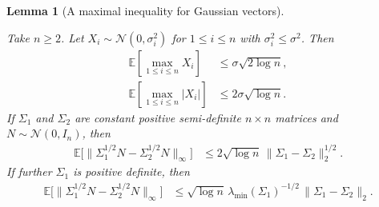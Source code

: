 \documentclass[11pt,lof]{puthesis}
\newcommand{\E}{\ensuremath{\mathbb{E}}}
\newcommand{\cN}{\ensuremath{\mathcal{N}}}
\theoremstyle{break}
\newtheorem{lemma}{Lemma}[section]
\theoremstyle{proof}
\begin{document}
\begin{lemma}[A maximal inequality for Gaussian vectors]
\label{lem:kernel_app_gaussian_vector_maximal}

Take $n \geq 2$.
Let $X_i \sim \cN(0, \sigma_i^2)$
for $1 \leq i \leq n$
with $\sigma_i^2 \leq \sigma^2$.
Then
%
\begin{align}
\label{eq:kernel_app_gaussian_vector_maximal}
\E\left[
\max_{1 \leq i \leq n}
X_i
\right]
&\leq
\sigma \sqrt{2 \log n}, \\
\label{eq:kernel_app_gaussian_vector_maximal_abs}
\E\left[
\max_{1 \leq i \leq n}
|X_i|
\right]
&\leq
2 \sigma \sqrt{\log n}.
\end{align}
%
If $\Sigma_1$ and $\Sigma_2$ are constant
positive semi-definite $n \times n$ matrices
and $N \sim \cN(0,I_n)$,
then
%
\begin{align}
\label{eq:kernel_app_gaussian_difference_psd}
\E\Big[
\big\|
\Sigma_1^{1/2} N
- \Sigma_2^{1/2} N
\big\|_\infty
\Big]
&\leq
2 \sqrt{\log n} \,
\big\|
\Sigma_1 - \Sigma_2
\big\|_2^{1/2}.
\end{align}
%
If further $\Sigma_1$ is
positive definite,
then
%
\begin{align}
\label{eq:kernel_app_gaussian_difference_pd}
\E\Big[
\big\|
\Sigma_1^{1/2} N
- \Sigma_2^{1/2} N
\big\|_\infty
\Big]
&\leq
\sqrt{\log n} \,
\lambda_{\min}(\Sigma_1)^{-1/2} \,
\big\|
\Sigma_1 - \Sigma_2
\big\|_2.
\end{align}

\end{lemma}
\end{document}
